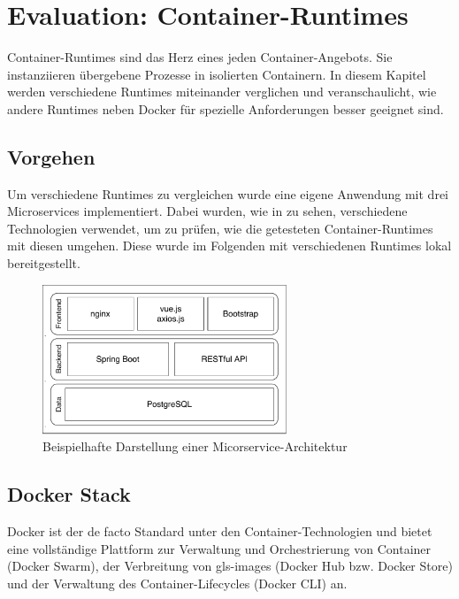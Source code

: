 \chapter{Evaluation: Container-Runtimes}
\label{chap:compCtnrRuntimes}

Container-Runtimes sind das Herz eines jeden Container-Angebots. Sie instanziieren übergebene Prozesse in isolierten Containern. In diesem Kapitel werden verschiedene Runtimes miteinander verglichen und veranschaulicht, wie andere Runtimes neben Docker für spezielle Anforderungen besser geeignet sind.

\section{Vorgehen}
\label{sec:vorgehen}
Um verschiedene Runtimes zu vergleichen wurde eine eigene Anwendung mit drei Microservices implementiert. Dabei wurden, wie in  zu sehen, verschiedene Technologien verwendet, um zu prüfen, wie die getesteten Container-Runtimes mit diesen umgehen. Diese wurde im Folgenden mit verschiedenen Runtimes lokal bereitgestellt.

\begin{figure}[h]
	\begin{center}
		\includegraphics[width=0.65\textwidth]{bilder/microservice-example-stack.pdf}
		\caption{Beispielhafte Darstellung einer Micorservice-Architektur}
		\label{fig:todosStack}
	\end{center}
\end{figure}

\section{Docker Stack}
\label{sec:compDocker}
Docker ist der de facto Standard unter den Container-Technologien und bietet eine vollständige Plattform zur Verwaltung und Orchestrierung von Container (Docker Swarm), der Verbreitung von \glspl{gls-image} (Docker Hub bzw. Docker Store) und der Verwaltung des Container-Lifecycles (Docker CLI) an.


